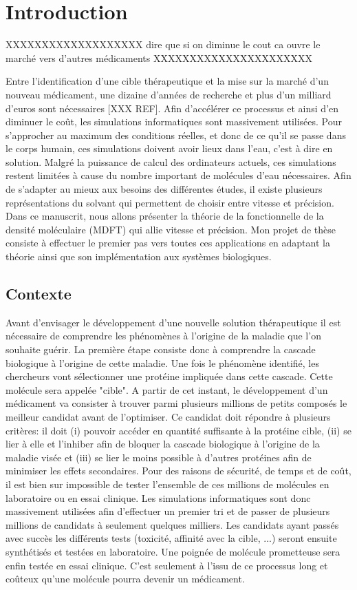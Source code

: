 \chapter{Introduction}
\label{chap:introduction}
XXXXXXXXXXXXXXXXXXX dire que si on diminue le cout ca ouvre le marché vers d'autres médicaments XXXXXXXXXXXXXXXXXXXXXX 

Entre l'identification d'une cible thérapeutique et la mise sur la marché d'un nouveau médicament, une dizaine d'années de recherche et plus d'un milliard d’euros sont nécessaires [XXX REF]. Afin d'accélérer ce processus et ainsi d'en diminuer le coût, les simulations informatiques sont massivement utilisées. Pour s'approcher au maximum des conditions réelles, et donc de ce qu'il se passe dans le corps humain, ces simulations doivent avoir lieux dans l'eau, c'est à dire en solution. Malgré la puissance de calcul des ordinateurs actuels, ces simulations restent limitées à cause du nombre important de molécules d'eau nécessaires. Afin de s'adapter au mieux aux besoins des différentes études, il existe plusieurs représentations du solvant qui permettent de choisir entre vitesse et précision. Dans ce manuscrit, nous allons présenter la théorie de la fonctionnelle de la densité moléculaire (MDFT) qui allie vitesse et précision. Mon projet de thèse consiste à effectuer le premier pas vers toutes ces applications en adaptant la théorie ainsi que son implémentation aux systèmes biologiques.



\section{Contexte}
Avant d'envisager le développement d'une nouvelle solution thérapeutique il est nécessaire de comprendre les phénomènes à l'origine de la maladie que l'on souhaite guérir. La première étape consiste donc à comprendre la cascade biologique à l'origine de cette maladie. Une fois le phénomène identifié, les chercheurs vont sélectionner une protéine impliquée dans cette cascade. Cette molécule sera appelée "cible". A partir de cet instant, le développement d'un médicament va consister à trouver  parmi plusieurs millions de petits composés le meilleur candidat avant de l'optimiser. Ce candidat doit répondre à plusieurs critères: il doit (i) pouvoir accéder en quantité suffisante à la protéine cible, (ii) se lier à elle et l'inhiber afin de bloquer la cascade biologique à l'origine de la maladie visée et (iii) se lier le moins possible à d'autres protéines afin de minimiser les effets secondaires. Pour des raisons de sécurité, de temps et de coût, il est bien sur impossible de tester l'ensemble de ces millions de molécules en laboratoire ou en essai clinique. Les simulations informatiques sont donc massivement utilisées afin d'effectuer un premier tri et de passer de plusieurs millions de candidats à seulement quelques milliers. Les candidats ayant passés avec succès les différents tests (toxicité, affinité avec la cible, ...) seront ensuite synthétisés et testées en laboratoire. Une poignée de molécule prometteuse sera enfin testée en essai clinique. C'est seulement à l'issu de ce processus long et coûteux qu'une molécule pourra devenir un médicament.


